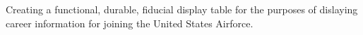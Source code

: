 Creating a functional, durable, fiducial display table for the purposes of dislaying career information for joining the United States Airforce.
